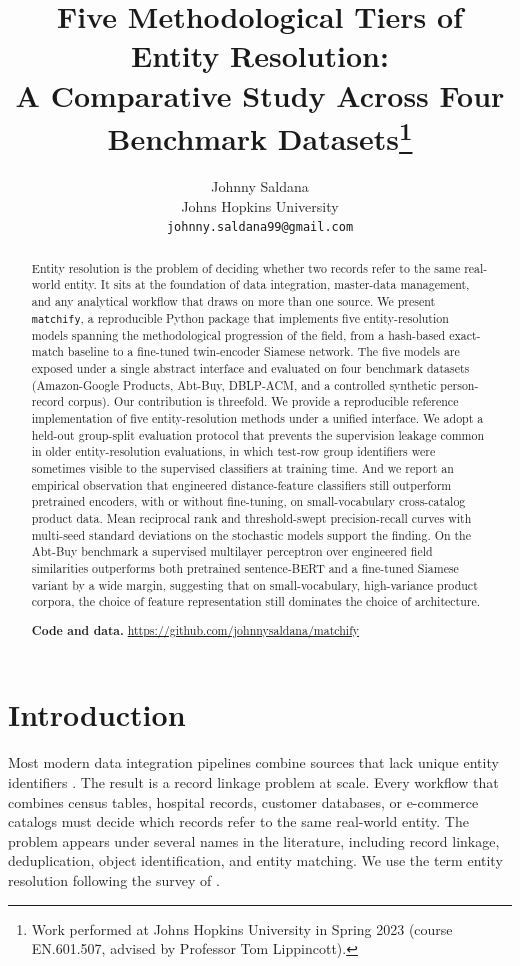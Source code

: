 \documentclass[10pt,letterpaper]{article}
\title{\bfseries Five Methodological Tiers of Entity Resolution: \\
A Comparative Study Across Four Benchmark Datasets\thanks{Work
performed at Johns Hopkins University in Spring 2023 (course
EN.601.507, advised by Professor Tom Lippincott).}}
\author{Johnny Saldana \\
Johns Hopkins University \\
\texttt{johnny.saldana99@gmail.com}}
\date{}
\begin{document}
\maketitle

\begin{abstract}
\noindent
Entity resolution is the problem of deciding whether two records refer
to the same real-world entity. It sits at the foundation of data
integration, master-data management, and any analytical workflow that
draws on more than one source. We present \texttt{matchify}, a
reproducible Python package that implements five entity-resolution
models spanning the methodological progression of the field, from a
hash-based exact-match baseline to a fine-tuned twin-encoder Siamese
network. The five models are exposed under a single abstract interface
and evaluated on four benchmark datasets (Amazon-Google Products,
Abt-Buy, DBLP-ACM, and a controlled synthetic person-record corpus).
Our contribution is threefold. We provide a reproducible reference
implementation of five entity-resolution methods under a unified
interface. We adopt a held-out group-split evaluation protocol that
prevents the supervision leakage common in older entity-resolution
evaluations, in which test-row group identifiers were sometimes
visible to the supervised classifiers at training time. And we report
an empirical observation that engineered distance-feature classifiers
still outperform pretrained encoders, with or without fine-tuning, on
small-vocabulary cross-catalog product data. Mean reciprocal rank and
threshold-swept precision-recall curves with multi-seed standard
deviations on the stochastic models support the finding. On the
Abt-Buy benchmark a supervised multilayer perceptron over engineered
field similarities outperforms both pretrained sentence-BERT and a
fine-tuned Siamese variant by a wide margin, suggesting that on
small-vocabulary, high-variance product corpora, the choice of feature
representation still dominates the choice of architecture.

\medskip
\noindent\textbf{Code and data.}
\url{https://github.com/johnnysaldana/matchify}
\end{abstract}

\section{Introduction}

Most modern data integration pipelines combine sources that lack
unique entity identifiers \citep{christen2012}. The result is a record
linkage problem at scale. Every workflow that combines census tables,
hospital records, customer databases, or e-commerce catalogs must
decide which records refer to the same real-world entity. The problem
appears under several names in the literature, including record
linkage, deduplication, object identification, and entity matching. We
use the term entity resolution following the survey of
\citet{papadakis2021}.
\end{document}
